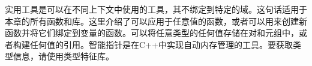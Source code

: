 


实用工具是可以在不同上下文中使用的工具，其不绑定到特定的域。这句话适用于本章的所有函数和库。这里介绍了可以应用于任意值的函数，或者可以用来创建新函数并将它们绑定到变量的函数。可以将任意类型的任何值存储在对和元组中，或者构建任何值的引用。智能指针是在C++中实现自动内存管理的工具。要获取类型信息，请使用类型特征库。